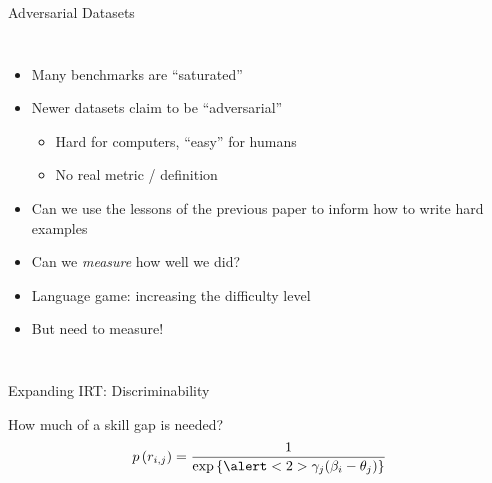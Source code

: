 \documentclass[compress]{beamer}
\newcommand{\ex}[1]{\mbox{exp}\left\{ #1\right\} }
\begin{document}
  \begin{frame}{Adversarial Datasets}

    \begin{columns}
            \begin{itemize}
              
            \item Many benchmarks are ``saturated''
            \item Newer datasets claim to be ``adversarial''
              \begin{itemize}
              \item Hard for computers, ``easy'' for humans
              \item No real metric / definition
              \end{itemize}
            \item Can we use the lessons of the previous paper to inform how to write hard examples
            \item Can we \emph{measure} how well we did?
              \pause
            \item Language game: increasing the difficulty level
              \item But need to measure!
    \end{itemize}
            \end{columns}
 \end{frame}

    \begin{frame}{Expanding IRT: Discriminability}

      \begin{block}{How much of a skill gap is needed?}
      \begin{equation}
        p\left(r_{i,j} \right) = \frac{ 1 }{ \ex{ \alert<2>{\gamma_j} (\beta_i - \theta_j ) }}
      \end{equation}
      \end{block}


      \end{frame}
    
\end{document}

